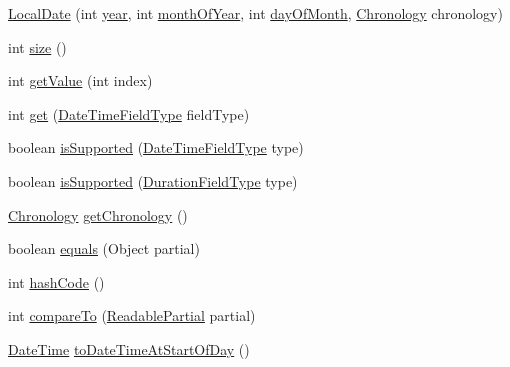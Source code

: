 \begin{DoxyCompactItemize}
\item 
\hyperlink{classorg_1_1joda_1_1time_1_1_local_date_a45b29bb88b83e3588e28507c760c3dfd}{Local\-Date} (int \hyperlink{classorg_1_1joda_1_1time_1_1_local_date_a0bae1887eb2fa9df0d965988d04a37de}{year}, int \hyperlink{classorg_1_1joda_1_1time_1_1_local_date_a00923ad74b6ab2f01e45d3f4804f15f7}{month\-Of\-Year}, int \hyperlink{classorg_1_1joda_1_1time_1_1_local_date_a876472f9f0711437971e9b5c029b7474}{day\-Of\-Month}, \hyperlink{classorg_1_1joda_1_1time_1_1_chronology}{Chronology} chronology)
\item 
int \hyperlink{classorg_1_1joda_1_1time_1_1_local_date_af03ec5ba9e86b43e305e29b22bdab30e}{size} ()
\item 
int \hyperlink{classorg_1_1joda_1_1time_1_1_local_date_a20d2aa8bd311a7907a29834bc6aadecf}{get\-Value} (int index)
\item 
int \hyperlink{classorg_1_1joda_1_1time_1_1_local_date_a1f215dbc2a3f142e34cd5475b8204421}{get} (\hyperlink{classorg_1_1joda_1_1time_1_1_date_time_field_type}{Date\-Time\-Field\-Type} field\-Type)
\item 
boolean \hyperlink{classorg_1_1joda_1_1time_1_1_local_date_a29c678f852c3826e7536b50d44364f3d}{is\-Supported} (\hyperlink{classorg_1_1joda_1_1time_1_1_date_time_field_type}{Date\-Time\-Field\-Type} type)
\item 
boolean \hyperlink{classorg_1_1joda_1_1time_1_1_local_date_a6f63b0a390c750c7e2f8440288407eaa}{is\-Supported} (\hyperlink{classorg_1_1joda_1_1time_1_1_duration_field_type}{Duration\-Field\-Type} type)
\item 
\hyperlink{classorg_1_1joda_1_1time_1_1_chronology}{Chronology} \hyperlink{classorg_1_1joda_1_1time_1_1_local_date_a5ad9d7c497c7e64fe7363d9bafc06c19}{get\-Chronology} ()
\item 
boolean \hyperlink{classorg_1_1joda_1_1time_1_1_local_date_a3a30ba5efa27fa6257e61e8f04bf38c5}{equals} (Object partial)
\item 
int \hyperlink{classorg_1_1joda_1_1time_1_1_local_date_a2c1ad03fb871b23693589a8b058f0513}{hash\-Code} ()
\item 
int \hyperlink{classorg_1_1joda_1_1time_1_1_local_date_ad3a9acd2656acefa4ebf1d48c4771be6}{compare\-To} (\hyperlink{interfaceorg_1_1joda_1_1time_1_1_readable_partial}{Readable\-Partial} partial)
\item 
\hyperlink{classorg_1_1joda_1_1time_1_1_date_time}{Date\-Time} \hyperlink{classorg_1_1joda_1_1time_1_1_local_date_afb50fb737899cbfcf41216647d190fb7}{to\-Date\-Time\-At\-Start\-Of\-Day} ()
\item 

\end{DoxyCompactItemize}
